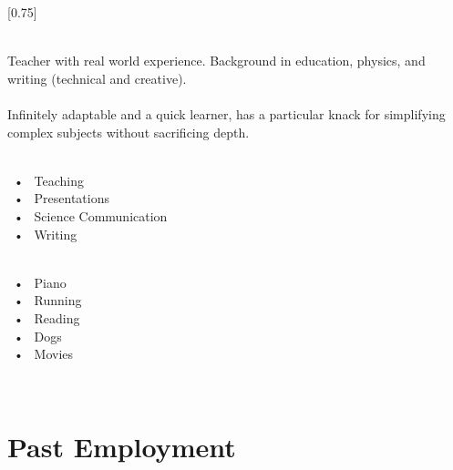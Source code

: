 \documentclass[lighthipster]{simplehipstercv}
\begin{document}
\setlength{\columnsep}{1.5cm}
[0.75]
\begin{paracol}{2}

\paracolbackgroundoptions



\footnotesize
{\setasidefontcolour
\begin{center}
\end{center}
\bigskip
\bigskip
{}\\

Teacher with real world experience. Background in education, physics, and
writing (technical and creative).\\\\Infinitely adaptable and a quick learner,
has a particular knack for simplifying complex subjects without sacrificing
depth.

\bigskip

 \\[0.5em]
~•~ Teaching\\~•~ Presentations\\~•~ Science Communication\\~•~ Writing

\bigskip

\\[0.5em]
~•~ Piano\\~•~ Running\\~•~ Reading \\~•~ Dogs\\~•~ Movies

\vspace{4em}

\\


\phantom{turn the page}

\phantom{turn the page}
}
\switchcolumn

\small
\section*{Past Employment}


\end{paracol}
\end{document}
